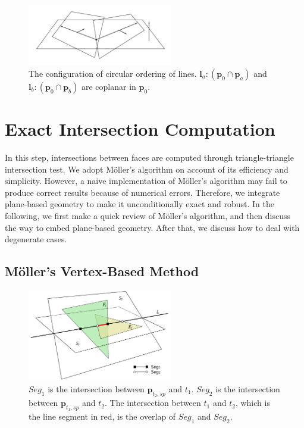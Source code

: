 \documentclass[10pt,journal,compsoc]{IEEEtran}
\begin{document}
\begin{figure}[t]
\centering
\includegraphics[width=2.5in]{circularorder}
\caption{The configuration of circular ordering of lines. $\bm{l}_a\colon(\bm{p}_0 \cap \bm{p}_a)$ and $\bm{l}_b\colon(\bm{p}_0 \cap \bm{p}_b)$ are coplanar in $\bm{p}_0$.}
\label{fig:circularorder}
\end{figure}


\section{Exact Intersection Computation}

\label{section:isect}
In this step, intersections between faces are computed through triangle-triangle intersection test. We adopt M\"{o}ller's algorithm \cite{moller1997fast} on account of its efficiency and simplicity. However, a naive implementation of M\"{o}ller's algorithm may fail to produce correct results because of numerical errors. Therefore, we integrate plane-based geometry to make it unconditionally exact and robust. In the following, we first make a quick review of M\"{o}ller's algorithm, and then discuss the way to embed plane-based geometry. After that, we discuss how to deal with degenerate cases.

\subsection{M\"{o}ller's Vertex-Based Method}

\begin{figure}[t]
\centering
\includegraphics[width=2.5in]{projection}
\caption{$Seg_1$ is the intersection between $\bm{p}_{t_2, sp}$ and $t_1$. $Seg_2$ is the intersection between $\bm{p}_{t_1, sp}$ and $t_2$. The intersection between $t_1$ and $t_2$, which is the line segment in red, is the overlap of $Seg_1$ and $Seg_2$.}
\label{fig_projection}
\end{figure}
\end{document}
